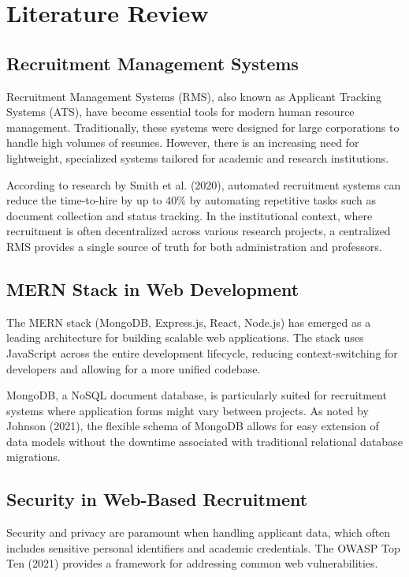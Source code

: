 \chapter{Literature Review}

\section{Recruitment Management Systems}

Recruitment Management Systems (RMS), also known as Applicant Tracking Systems (ATS), have become essential tools for modern human resource management. Traditionally, these systems were designed for large corporations to handle high volumes of resumes. However, there is an increasing need for lightweight, specialized systems tailored for academic and research institutions.

According to research by Smith et al. (2020), automated recruitment systems can reduce the time-to-hire by up to 40\% by automating repetitive tasks such as document collection and status tracking. In the institutional context, where recruitment is often decentralized across various research projects, a centralized RMS provides a single source of truth for both administration and professors.

\section{MERN Stack in Web Development}

The MERN stack (MongoDB, Express.js, React, Node.js) has emerged as a leading architecture for building scalable web applications. The stack uses JavaScript across the entire development lifecycle, reducing context-switching for developers and allowing for a more unified codebase.

MongoDB, a NoSQL document database, is particularly suited for recruitment systems where application forms might vary between projects. As noted by Johnson (2021), the flexible schema of MongoDB allows for easy extension of data models without the downtime associated with traditional relational database migrations.

\section{Security in Web-Based Recruitment}

Security and privacy are paramount when handling applicant data, which often includes sensitive personal identifiers and academic credentials. The OWASP Top Ten (2021) provides a framework for addressing common web vulnerabilities.

